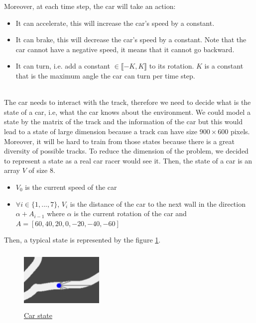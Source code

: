 \documentclass[11pt,a4paper]{article}
\newcounter{fig}
\newcommand{\tab}{\phantom{xxx}}
\newcommand{\mlist}[1]{\begin{itemize}[noitemsep,topsep=0pt]#1\end{itemize}}
\begin{document}
Moreover, at each time step, the car will take an action:
\mlist{
\item It can accelerate, this will increase the car's speed by a constant.
\item It can brake, this will decrease the car's speed by a constant. Note that the car cannot have a negative speed, it means that it cannot go backward.
\item It can turn, i.e. add a constant $\in \llbracket-K,K\rrbracket$ to its rotation. $K$ is a constant that is the maximum angle the car can turn per time step.
}
\tab \\
The car needs to interact with the track, therefore we need to decide what is the state of a car, i.e, what the car knows about the environment. 
We could model a state by the matrix of the track and the information of the car but this would lead to a state of large dimension because a track can have size $900\times600$ pixels. Moreover, it will be hard to train from those states because there is a great diversity of possible tracks. 
To reduce the dimension of the problem, we decided to represent a state as a real car racer would see it. Then, the state of a car is an array $V$ of size $8$.
\mlist{
\item $V_0$ is the current speed of the car
\item $\forall i\in\{1,...,7\}$, $V_i$ is the distance of the car to the next wall in the direction $\alpha + A_{i-1}$ where $\alpha$ is the current rotation of the car and $A=[60, 40, 20, 0, -20, -40, -60]$
}
Then, a typical state is represented by the figure \ref{figure:car state}.
\begin{center}
	\begin{figure}[ht]
		\centering
		\includegraphics[width=4cm, height=3cm]{car_state.png}
		\caption{\underline{Car state}}
		\label{figure:car state}
	\end{figure}
\end{center}
		
\end{document}
